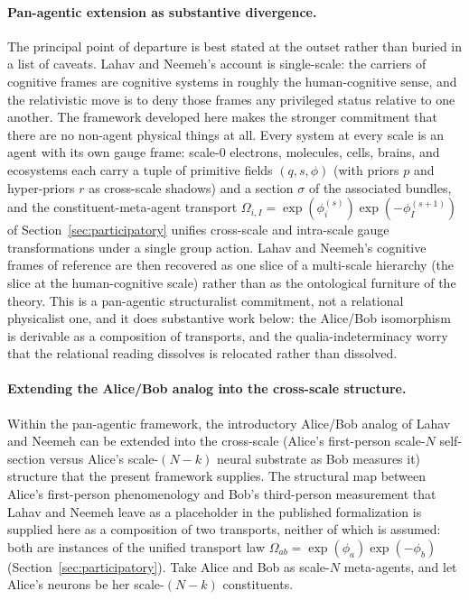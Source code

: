 \documentclass[11pt]{article}
\begin{document}
\paragraph{Pan-agentic extension as substantive divergence.}
The principal point of departure is best stated at the outset rather than buried in a list of caveats. Lahav and Neemeh's account is single-scale: the carriers of cognitive frames are cognitive systems in roughly the human-cognitive sense, and the relativistic move is to deny those frames any privileged status relative to one another. The framework developed here makes the stronger commitment that there are no non-agent physical things at all. Every system at every scale is an agent with its own gauge frame: scale-0 electrons, molecules, cells, brains, and ecosystems each carry a tuple of primitive fields $(q, s, \phi)$ (with priors $p$ and hyper-priors $r$ as cross-scale shadows) and a section $\sigma$ of the associated bundles, and the constituent-meta-agent transport $\Omega_{i,I} = \exp(\phi_i^{(s)}) \exp(-\phi_I^{(s+1)})$ of Section~\ref{sec:participatory} unifies cross-scale and intra-scale gauge transformations under a single group action. Lahav and Neemeh's cognitive frames of reference are then recovered as one slice of a multi-scale hierarchy (the slice at the human-cognitive scale) rather than as the ontological furniture of the theory. This is a pan-agentic structuralist commitment, not a relational physicalist one, and it does substantive work below: the Alice/Bob isomorphism is derivable as a composition of transports, and the qualia-indeterminacy worry that the relational reading dissolves is relocated rather than dissolved.

\paragraph{Extending the Alice/Bob analog into the cross-scale structure.}
Within the pan-agentic framework, the introductory Alice/Bob analog of Lahav and Neemeh can be extended into the cross-scale (Alice's first-person scale-$N$ self-section versus Alice's scale-$(N-k)$ neural substrate as Bob measures it) structure that the present framework supplies. The structural map between Alice's first-person phenomenology and Bob's third-person measurement that Lahav and Neemeh leave as a placeholder in the published formalization is supplied here as a composition of two transports, neither of which is assumed: both are instances of the unified transport law $\Omega_{ab} = \exp(\phi_a) \exp(-\phi_b)$ (Section~\ref{sec:participatory}). Take Alice and Bob as scale-$N$ meta-agents, and let Alice's neurons be her scale-$(N-k)$ constituents.
\end{document}
